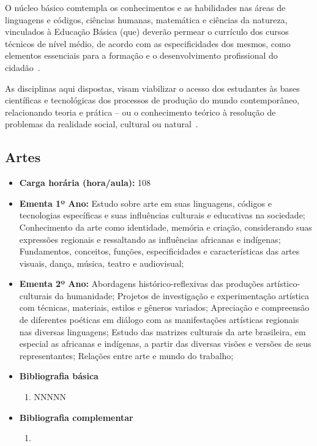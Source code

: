 \documentclass[11pt,fleqn]{book} %
\begin{document}
O núcleo básico comtempla os conhecimentos e as habilidades nas áreas de linguagens e códigos, ciências humanas, matemática e ciências da natureza, vinculados à Educação Básica (que) deverão permear o currículo dos cursos técnicos de nível médio, de acordo com as especificidades dos mesmos, como elementos essenciais para a formação e o desenvolvimento profissional do cidadão~\cite{Resolucao06De2012}.

As disciplinas aqui dispostas, visam viabilizar o acesso dos estudantes às bases científicas e tecnológicas dos processos de produção do mundo contemporâneo, relacionando teoria e prática – ou o conhecimento teórico à resolução de problemas da realidade social, cultural ou natural~\cite{BNCC2019}.

\newpage
\subsection{Artes}\label{disc:artes}
\begin{itemize}
	\item \textbf{Carga horária (hora/aula):} 108
	\item \textbf{Ementa 1º Ano:}
	Estudo sobre arte em suas linguagens, códigos e tecnologias específicas e suas influências culturais e educativas na sociedade;
	Conhecimento da arte como identidade, memória e criação, considerando suas expressões regionais e ressaltando as influências africanas e indígenas;
	Fundamentos, conceitos, funções, especificidades e características das artes visuais, dança, música, teatro e audiovisual;
	\item \textbf{Ementa 2º Ano:}
	Abordagens histórico-reflexivas das produções artístico-culturais da humanidade;
	Projetos de investigação e experimentação artística com técnicas, materiais, estilos e gêneros variados;
	Apreciação e compreensão de diferentes poéticas em diálogo com as manifestações artísticas regionais nas diversas linguagens;
	Estudo das matrizes culturais da arte brasileira, em especial as africanas e indígenas, a partir das diversas visões e versões de seus representantes;
	Relações entre arte e mundo do trabalho;
	\item \textbf{Bibliografia básica}
	\begin{enumerate}
		\item NNNNN
	\end{enumerate}
	\item \textbf{Bibliografia complementar}
	\begin{enumerate}
		\item 
	\end{enumerate}	
\end{itemize}
\end{document}
